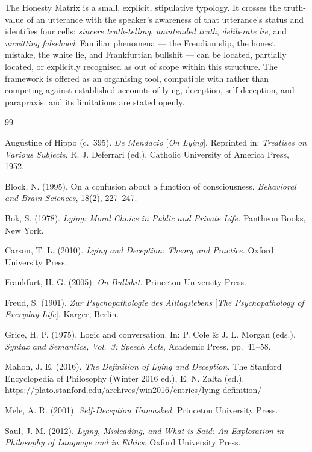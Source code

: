 \documentclass[11pt,a4paper]{article}
\begin{document}
The Honesty Matrix is a small, explicit, stipulative typology. It
crosses the truth-value of an utterance with the speaker's awareness of
that utterance's status and identifies four cells: \emph{sincere
truth-telling}, \emph{unintended truth}, \emph{deliberate lie}, and
\emph{unwitting falsehood}. Familiar phenomena --- the Freudian slip,
the honest mistake, the white lie, and Frankfurtian bullshit --- can be
located, partially located, or explicitly recognised as out of scope
within this structure. The framework is offered as an organising tool,
compatible with rather than competing against established accounts of
lying, deception, self-deception, and parapraxis, and its limitations
are stated openly.

\begin{thebibliography}{99}

Augustine of Hippo (c.~395).
\emph{De Mendacio} [\emph{On Lying}].
Reprinted in: \emph{Treatises on Various Subjects}, R. J. Deferrari
(ed.), Catholic University of America Press, 1952.

Block, N. (1995).
On a confusion about a function of consciousness.
\emph{Behavioral and Brain Sciences}, 18(2), 227--247.

Bok, S. (1978).
\emph{Lying: Moral Choice in Public and Private Life.}
Pantheon Books, New York.

Carson, T. L. (2010).
\emph{Lying and Deception: Theory and Practice.}
Oxford University Press.

Frankfurt, H. G. (2005).
\emph{On Bullshit.}
Princeton University Press.

Freud, S. (1901).
\emph{Zur Psychopathologie des Alltagslebens}
[\emph{The Psychopathology of Everyday Life}].
Karger, Berlin.

Grice, H. P. (1975).
Logic and conversation.
In: P. Cole \& J. L. Morgan (eds.),
\emph{Syntax and Semantics, Vol.~3: Speech Acts},
Academic Press, pp.~41--58.

Mahon, J. E. (2016).
\emph{The Definition of Lying and Deception.}
The Stanford Encyclopedia of Philosophy (Winter 2016 ed.),
E. N. Zalta (ed.).
\url{https://plato.stanford.edu/archives/win2016/entries/lying-definition/}

Mele, A. R. (2001).
\emph{Self-Deception Unmasked.}
Princeton University Press.

Saul, J. M. (2012).
\emph{Lying, Misleading, and What is Said: An Exploration in Philosophy
of Language and in Ethics.}
Oxford University Press.


\end{thebibliography}
\end{document}
